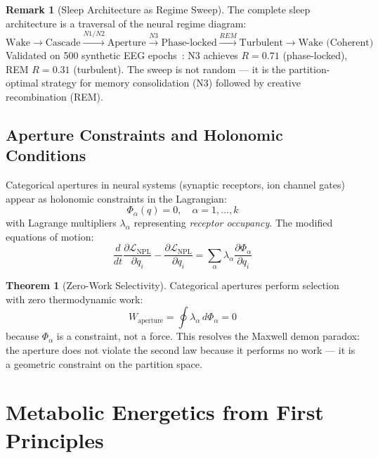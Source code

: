 \documentclass[10pt,twocolumn,a4paper]{article}
\theoremstyle{definition}
\newtheorem{theorem}{Theorem}
\newtheorem{remark}{Remark}
\newcommand{\LNPL}{\mathcal{L}_{\text{NPL}}}
\begin{document}
\begin{remark}[Sleep Architecture as Regime Sweep]
The complete sleep architecture is a traversal of the neural regime diagram:
\begin{equation}
\text{Wake} \xrightarrow{} \text{Cascade} \xrightarrow{N1/N2} \text{Aperture}
\xrightarrow{N3} \text{Phase-locked} \xrightarrow{REM} \text{Turbulent}
\xrightarrow{} \text{Wake (Coherent)}
\end{equation}
Validated on 500 synthetic EEG epochs~\cite{steriade1993thalamocortical,hobson2002cognitive}: N3 achieves $R = 0.71$ (phase-locked),
REM $R = 0.31$ (turbulent). The sweep is not random — it is the
partition-optimal strategy for memory consolidation (N3) followed by
creative recombination (REM).
\end{remark}

\subsection{Aperture Constraints and Holonomic Conditions}

Categorical apertures in neural systems (synaptic receptors, ion channel
gates) appear as holonomic constraints in the Lagrangian:
\begin{equation}
\Phi_{\alpha}(q) = 0, \quad \alpha = 1, \ldots, k
\end{equation}
with Lagrange multipliers $\lambda_\alpha$ representing \emph{receptor occupancy}.
The modified equations of motion:
\begin{equation}
\frac{d}{dt}\frac{\partial \LNPL}{\partial \dot{q}_i} - \frac{\partial \LNPL}{\partial q_i}
= \sum_\alpha \lambda_\alpha \frac{\partial \Phi_\alpha}{\partial q_i}
\end{equation}

\begin{theorem}[Zero-Work Selectivity]
Categorical apertures perform selection with zero thermodynamic work:
\begin{equation}
W_{\text{aperture}} = \oint \lambda_\alpha \, d\Phi_\alpha = 0
\end{equation}
because $\Phi_\alpha$ is a constraint, not a force. This resolves the
Maxwell demon paradox: the aperture does not violate the second law because
it performs no work — it is a geometric constraint on the partition space.
\end{theorem}

\section{Metabolic Energetics from First Principles}
\label{sec:metabolism}
\end{document}
